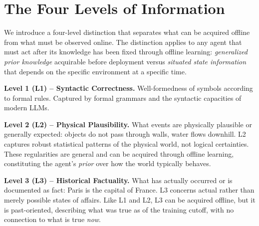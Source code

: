 \section{The Four Levels of Information}

We introduce a four-level distinction that separates what can be acquired offline from what must be observed online. The distinction applies to any agent that must act after its knowledge has been fixed through offline learning: \emph{generalized prior knowledge} acquirable before deployment versus \emph{situated state information} that depends on the specific environment at a specific time.

\textbf{Level 1 (L1) -- Syntactic Correctness.} Well-formedness of symbols according to formal rules. Captured by formal grammars and the syntactic capacities of modern LLMs.

\textbf{Level 2 (L2) -- Physical Plausibility.} What events are physically plausible or generally expected: objects do not pass through walls, water flows downhill. L2 captures robust statistical patterns of the physical world, not logical certainties. These regularities are general and can be acquired through offline learning, constituting the agent's \emph{prior} over how the world typically behaves.

\textbf{Level 3 (L3) -- Historical Factuality.} What has actually occurred or is documented as fact: Paris is the capital of France. L3 concerns actual rather than merely possible states of affairs. Like L1 and L2, L3 can be acquired offline, but it is past-oriented, describing what was true as of the training cutoff, with no connection to what is true \emph{now}.

